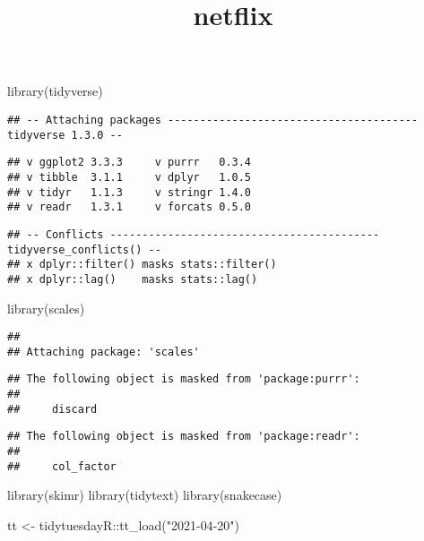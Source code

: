 \documentclass[
]{article}
\title{netflix}
\author{}
\date{\vspace{-2.5em}}
\newenvironment{Shaded}{\begin{snugshade}}{\end{snugshade}}
\newcommand{\FunctionTok}[1]{\textcolor[rgb]{0.00,0.00,0.00}{#1}}
\newcommand{\NormalTok}[1]{#1}
\newcommand{\OtherTok}[1]{\textcolor[rgb]{0.56,0.35,0.01}{#1}}
\newcommand{\SpecialCharTok}[1]{\textcolor[rgb]{0.00,0.00,0.00}{#1}}
\newcommand{\StringTok}[1]{\textcolor[rgb]{0.31,0.60,0.02}{#1}}
\begin{document}
\maketitle

\begin{Shaded}
\begin{Highlighting}[]
\FunctionTok{library}\NormalTok{(tidyverse)}
\end{Highlighting}
\end{Shaded}

\begin{verbatim}
## -- Attaching packages --------------------------------------- tidyverse 1.3.0 --
\end{verbatim}

\begin{verbatim}
## v ggplot2 3.3.3     v purrr   0.3.4
## v tibble  3.1.1     v dplyr   1.0.5
## v tidyr   1.1.3     v stringr 1.4.0
## v readr   1.3.1     v forcats 0.5.0
\end{verbatim}

\begin{verbatim}
## -- Conflicts ------------------------------------------ tidyverse_conflicts() --
## x dplyr::filter() masks stats::filter()
## x dplyr::lag()    masks stats::lag()
\end{verbatim}

\begin{Shaded}
\begin{Highlighting}[]
\FunctionTok{library}\NormalTok{(scales)}
\end{Highlighting}
\end{Shaded}

\begin{verbatim}
## 
## Attaching package: 'scales'
\end{verbatim}

\begin{verbatim}
## The following object is masked from 'package:purrr':
## 
##     discard
\end{verbatim}

\begin{verbatim}
## The following object is masked from 'package:readr':
## 
##     col_factor
\end{verbatim}

\begin{Shaded}
\begin{Highlighting}[]
\FunctionTok{library}\NormalTok{(skimr)}
\FunctionTok{library}\NormalTok{(tidytext)}
\FunctionTok{library}\NormalTok{(snakecase)}

\NormalTok{tt }\OtherTok{\textless{}{-}}\NormalTok{ tidytuesdayR}\SpecialCharTok{::}\FunctionTok{tt\_load}\NormalTok{(}\StringTok{"2021{-}04{-}20"}\NormalTok{)}
\end{Highlighting}
\end{Shaded}
\end{document}
